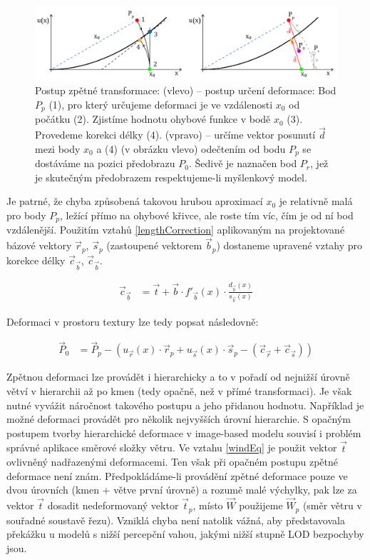 \begin{figure}[!hbt]
\begin{center}
\includegraphics[width=1.0\textwidth]{./figures/revDef_process.png}
\caption[Postup zpětné transformace]
{Postup zpětné transformace: (vlevo) – postup určení deformace: Bod $P_p$ (1), pro který určujeme deformaci je ve vzdálenosti $x_0$ od počátku (2). Zjistíme hodnotu ohybové funkce v bodě $x_0$ (3). Provedeme korekci délky (4).
(vpravo) – určíme vektor posunutí $\vec{d}$ mezi body $x_0$ a (4) (v obrázku vlevo) odečtením od bodu $P_p$ se dostáváme na pozici předobrazu $P_0$. Šedivě je naznačen bod $P_r$, jež je skutečným předobrazem respektujeme-li myšlenkový model. \label{fig:backwardTransformationProcess}}
\end{center}
\end{figure}
\pagebreak
Je patrné, že chyba způsobená takovou hrubou aproximací $x_0$ je relativně malá pro body $P_p$, ležící přímo na ohybové křivce, ale roste tím víc, čím je od ní bod vzdálenější. Použitím vztahů \eqref{lengthCorrection} aplikovaným na projektované bázové vektory $\vec{r}_p$, $\vec{s}_p$ (zastoupené vektorem $\vec{b}_p$) dostaneme upravené vztahy pro korekce délky $\vec{c}_{\vec{b}}$, $\vec{c}_{\vec{b}}$.

\begin{align} 
\vec{c}_{\vec{b} }&= \vec{t} + \vec{b} \cdot f'_{\vec{b} } (x)\cdot\frac {d_{\vec{b} }(x)}{s_{\vec{b} }(x)}
 \end{align}

Deformaci v prostoru textury lze tedy popsat následovně:

\begin{align}
\label{backwardDeformation} 
\vec{P}_0 &= \vec{P}_p - \left ( u_{\vec{r}} (x) \cdot \vec{r}_p + u_{\vec{s}} (x) \cdot \vec{s}_p - \left (\vec{c}_{\vec{r}} +\vec{c}_{\vec{s}}  \right ) \right )
\end{align}


Zpětnou deformaci lze provádět i hierarchicky a to v pořadí od nejnižší úrovně větví v hierarchii až po kmen (tedy opačně, než v přímé transformaci). Je však nutné vyvážit náročnost takového postupu a jeho přidanou hodnotu. Například je možné deformaci provádět pro několik nejvyšších úrovní hierarchie. 
S opačným postupem tvorby hierarchické deformace v image-based modelu souvisí i problém správné aplikace směrové složky větru. Ve vztahu \eqref{windEq} je použit vektor $\vec{t}$ ovlivněný nadřazenými deformacemi. Ten však při opačném postupu zpětné deformace není znám. Předpokládáme-li provádění zpětné deformace pouze ve dvou úrovních (kmen + větve první úrovně) a rozumě malé výchylky, pak lze za vektor $\vec{t}$ dosadit nedeformovaný vektor $\vec{t}_p$, místo $\vec{W}$ použijeme $\vec{W}_p$ (směr větru v souřadné soustavě řezu). Vzniklá chyba není natolik vážná, aby představovala překážku u modelů s nižší percepční vahou, jakými nižší stupně LOD bezpochyby jsou.

